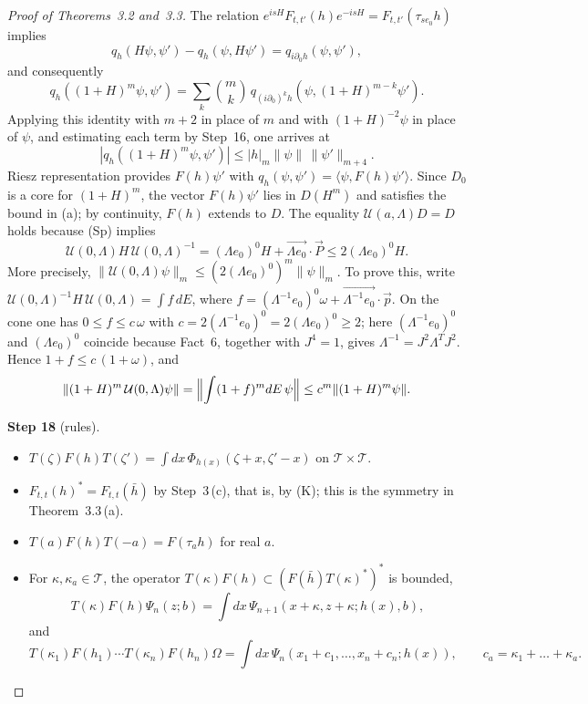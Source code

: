 \documentclass[11pt,letterpaper,reqno]{amsart}
\theoremstyle{definition}
\begin{document}
\begin{proof}[Proof of Theorems~3.2 and~3.3]
The relation $e^{isH}F_{t,t'}(h)e^{-isH}=F_{t,t'}(\tau_{se_0}h)$ implies
\begin{equation*}
q_h(H\psi,\psi')-q_h(\psi,H\psi')=q_{i\partial_0h}(\psi,\psi'),
\end{equation*}
and consequently
\begin{equation*}
q_h((1+H)^m\psi,\psi')=\sum_k\binom mk\,q_{(i\partial_0)^kh}(\psi,(1+H)^{m-k}\psi').
\end{equation*}
Applying this identity with $m+2$ in place of $m$ and with $(1+H)^{-2}\psi$ in place of $\psi$, and estimating each term by Step~16, one arrives at
\begin{equation*}
|q_h((1+H)^m\psi,\psi')|\le|h|_m\|\psi\|\,\|\psi'\|_{m+4}.
\end{equation*}
Riesz representation provides $F(h)\psi'$ with $q_h(\psi,\psi')=\langle\psi,F(h)\psi'\rangle$.
Since $D_0$ is a core for $(1+H)^m$, the vector $F(h)\psi'$ lies in $D(H^m)$ and satisfies the bound in (a); by continuity, $F(h)$ extends to $D$.
The equality $\mathcal U(a,\Lambda)D=D$ holds because (Sp) implies
\begin{equation*}
\mathcal U(0,\Lambda)H\,\mathcal U(0,\Lambda)^{-1}=(\Lambda e_0)^0H+\overrightarrow{\Lambda e_0}\cdot\vec P\le2(\Lambda e_0)^0H.
\end{equation*}
More precisely, $\|\mathcal U(0,\Lambda)\psi\|_m\le(2(\Lambda e_0)^0)^m\|\psi\|_m$.
To prove this, write $\mathcal U(0,\Lambda)^{-1}H\,\mathcal U(0,\Lambda)=\int f\,dE$, where $f=\allowbreak (\Lambda^{-1}e_0)^0\omega+\overrightarrow{\Lambda^{-1}e_0}\cdot\vec p$.
On the cone one has $0\le f\le c\,\omega$ with $c=2(\Lambda^{-1}e_0)^0=2(\Lambda e_0)^0\ge2$; here $(\Lambda^{-1}e_0)^0$ and $(\Lambda e_0)^0$ coincide because Fact~6, together with $J^4=1$, gives $\Lambda^{-1}=J^2\Lambda^TJ^2$.
Hence $1+f\le c\,(1+\omega)$, and
\begin{equation*}
\|(1+H)^m\,\mathcal U(0,\Lambda)\psi\|=\Bigl\|\int(1+f)^mdE\,\psi\Bigr\|\le c^m\|(1+H)^m\psi\|.
\end{equation*}

\textbf{Step 18} (rules).
\begin{itemize}
\item[(e1)] $T(\zeta)F(h)T(\zeta')=\int dx\,\Phi_{h(x)}(\zeta+x,\zeta'-x)$ on $\mathcal T\times\mathcal T$.
\item[(e2)] $F_{t,t}(h)^*=F_{t,t}(\bar h)$ by Step~3\,(c), that is, by (K); this is the symmetry in Theorem~3.3\,(a).
\item[(e3)] $T(a)F(h)T(-a)=F(\tau_ah)$ for real $a$.
\item[(e4)] For $\kappa,\kappa_a\in\mathcal T$, the operator $T(\kappa)F(h)\subset(F(\bar h)T(\kappa)^*)^*$ is bounded,
\begin{equation*}
T(\kappa)F(h)\Psi_n(z;b)=\int dx\,\Psi_{n+1}(x+\kappa,z+\kappa;h(x),b),
\end{equation*}
and
\begin{equation*}
T(\kappa_1)F(h_1)\cdots T(\kappa_n)F(h_n)\Omega=\int dx\,\Psi_n(x_1+c_1,\dots,x_n+c_n;h(x)),\qquad c_a=\kappa_1+\dots+\kappa_a.
\end{equation*}
\end{itemize}


\end{proof}
\end{document}
